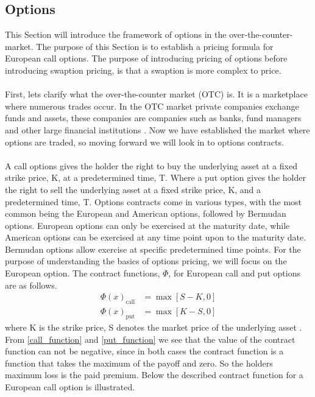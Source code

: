 \subsection{Options}
This Section will introduce the framework of options in the over-the-counter-market. 
The purpose of this Section is to establish a pricing formula for European call options.
The purpose of introducing pricing of options before introducing swaption pricing, is that a swaption is 
more complex to price. 
\\\\
First, lets clarify what the over-the-counter market (OTC) is. It is  a marketplace where numerous trades occur.
In the OTC market private companies exchange funds and assets, these companies are companies such as banks, fund managers and
other large financial institutions \cite{Hull}. Now we have established the market where 
options are traded, so moving forward we will look in to options contracts. 
\\\\
A call options gives the holder the right to buy the underlying asset at a fixed strike price, K, at a 
predetermined time, T. Where a put option gives the holder the right to sell the underlying asset at a fixed
strike price, K, and a predetermined time, T. Options contracts come in various types, with the 
most common being the European and American options, followed by Bermudan options. European options can only 
be exercised at the maturity date, while American options can be exercised at any time point upon to the maturity date.
Bermudan options allow exercise at specific predetermined time points.
For the purpose of understanding the basics of options pricing, we will focus on the European option. 
The contract functions, $\Phi$, for European call and put options are as follows.
\begin{align}
    \Phi(x)_{\text{call}} &=  \max[S-K,0] \label{call_function}\\ 
    \Phi(x)_{\text{put}} &= \max [K-S,0] \label{put_function}
\end{align}
where K is the strike price, S denotes the market price of the underlying asset \cite{Bjork}. From \autoref{call_function} and \autoref{put_function} we see
that the value of the contract function can not be negative, since in both cases the contract function is a 
function that takes the maximum of the payoff and zero. So the holders maximum loss is the paid premium. Below the described contract
function for a European call option is illustrated.

